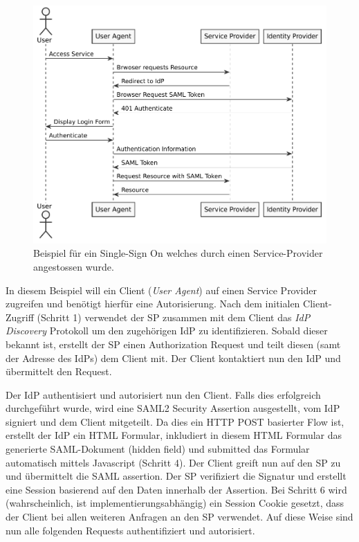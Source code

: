 \begin{figure}[h!]
	\includegraphics[width=\textwidth]{graphs/saml2.pdf}
	\centering
	\caption{Beispiel für ein Single-Sign On welches durch einen Service-Provider angestossen wurde.}
	\label{saml2_sso}
\end{figure}

In diesem Beispiel will ein Client (\textit{User Agent}) auf einen Service Provider zugreifen und benötigt hierfür eine Autorisierung. Nach dem initialen Client-Zugriff (Schritt 1) verwendet der SP zusammen mit dem Client das \textit{IdP Discovery} Protokoll um den zugehörigen IdP zu identifizieren. Sobald dieser bekannt ist, erstellt der SP einen Authorization Request und teilt diesen (samt der Adresse des IdPs) dem Client mit. Der Client kontaktiert nun den IdP und übermittelt den Request.

Der IdP authentisiert und autorisiert nun den Client. Falls dies erfolgreich durchgeführt wurde, wird eine SAML2 Security Assertion ausgestellt, vom IdP signiert und dem Client mitgeteilt. Da dies ein HTTP POST basierter Flow ist, erstellt der IdP ein HTML Formular, inkludiert in diesem HTML Formular das generierte SAML-Dokument (hidden field) und submitted das Formular automatisch mittels Javascript (Schritt 4). Der Client greift nun auf den SP zu und übermittelt die SAML assertion. Der SP verifiziert die Signatur und erstellt eine Session basierend auf den Daten innerhalb der Assertion. Bei Schritt 6 wird (wahrscheinlich, ist implementierungsabhängig) ein Session Cookie gesetzt, dass der Client bei allen weiteren Anfragen an den SP verwendet. Auf diese Weise sind nun alle folgenden Requests authentifiziert und autorisiert.

